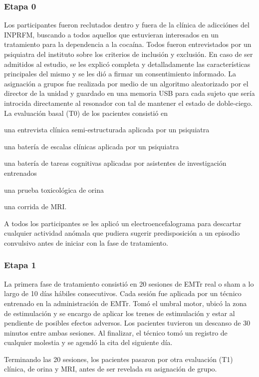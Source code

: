 \subsubsection{Etapa 0}
Los participantes fueron reclutados dentro y fuera de la clínica de adicciónes del INPRFM, buscando a todos aquellos que estuvieran interesados en un tratamiento para la dependencia a la cocaína.
Todos fueron entrevistados por un psiquiatra del instituto sobre los criterios de inclusión y exclusión.
En caso de ser admitidos al estudio, se les explicó completa y detalladamente las características principales del mismo y se les dió a firmar un consentimiento informado.
La asignación a grupos fue realizada por medio de un algoritmo aleatorizado por el director de la unidad y guardado en una memoria USB para cada sujeto que sería introcida directamente al resonador con tal de mantener el estado de doble-ciego.
La evaluación basal (T0) de los pacientes consistió en
\begin{enumerate*}[label=\emph{\alph*}), before=\unskip{: }, itemjoin={{; }}, itemjoin*={{, y }}]
    \item una entrevista clínica semi-estructurada aplicada por un psiquiatra
    \item una batería de escalas clínicas aplicada por un psiquiatra
    \item una batería de tareas cognitivas aplicadas por asistentes de investigación entrenados
    \item una prueba toxicológica de orina
    \item una corrida de MRI.
\end{enumerate*}
A todos los participantes se les aplicó un electroencefalograma para descartar cualquier actividad anómala que pudiera sugerir predisposición a un episodio convulsivo antes de iniciar con la fase de tratamiento.

\subsubsection{Etapa 1}
La primera fase de tratamiento consistió en 20 sesiones de EMTr real o sham a lo largo de 10 días hábiles consecutivos. Cada sesión fue aplicada por un técnico entrenado en la administración de EMTr. Tomó el umbral motor, ubicó la zona de estimulación y se encargo de aplicar los trenes de estimulación y estar al pendiente de posibles efectos adversos.
Los pacientes tuvieron un descanso de 30 minutos entre ambas sesiones.
Al finalizar, el técnico tomó un registro de cualquier molestia y se agendó la cita del siguiente día.\par
Terminando las 20 sesiones, los pacientes pasaron por otra evaluación (T1) clínica, de orina y MRI, antes de ser revelada su asignación de grupo.


